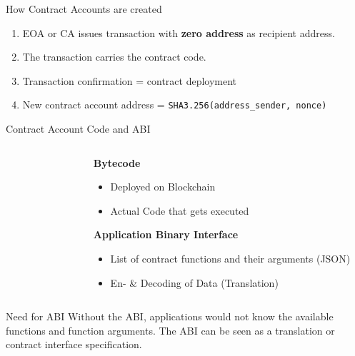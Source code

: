 \documentclass[handout]{beamer}
\begin{document}
\begin{frame}{How Contract Accounts are created}

\begin{enumerate}
				\item<1-> EOA or CA issues transaction with \textbf{zero address} as recipient address.
				\vspace{1em}
				\item<2-> The transaction carries the contract code.
				\item<3-> Transaction confirmation = contract deployment
				\item<4-> New contract account address = \texttt{SHA3.256(address\_sender, nonce)} %
\end{enumerate}
			
\end{frame}


\begin{frame}{Contract Account Code and ABI}
	\begin{columns}[T]
		\begin{column}{0.6\textwidth}
			\begin{figure}[h!]
				\center
					
			\end{figure}\vspace{1em}
		\end{column}
		\begin{column}{0.5\textwidth}
			\textbf{Bytecode}
				\begin{itemize}
					\item Deployed on Blockchain
					\item Actual Code that gets executed
				\end{itemize}
		\vspace{2em}
			\textbf{Application Binary Interface}
				\begin{itemize}
					\item List of contract functions and their arguments (JSON)
					\item En- \& Decoding of Data (Translation) 
				\end{itemize}
		\end{column}
	\end{columns}
\vspace{1em}
	\begin{keytakeaway}{Need for ABI}
		 Without the ABI, applications would not know the available functions and function arguments. The ABI can be seen as a translation or contract interface specification.
	\end{keytakeaway}		
\end{frame}
\end{document}
